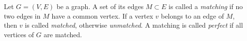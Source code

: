 

\setcounter{section}{4}
\setcounter{subsection}{1}
\setcounter{dfn}{1}

\begin{dfn}
Let $G = (V, E)$ be a graph.
A set of its edges $M \subset E$ is called a \emph{matching} if no two edges in $M$ have a common vertex.
If a vertex $v$ belongs to an edge of $M$, then $v$ is called \emph{matched}, otherwise \emph{unmatched}.
A matching is called \emph{perfect} if all vertices of $G$ are matched.
\end{dfn}

